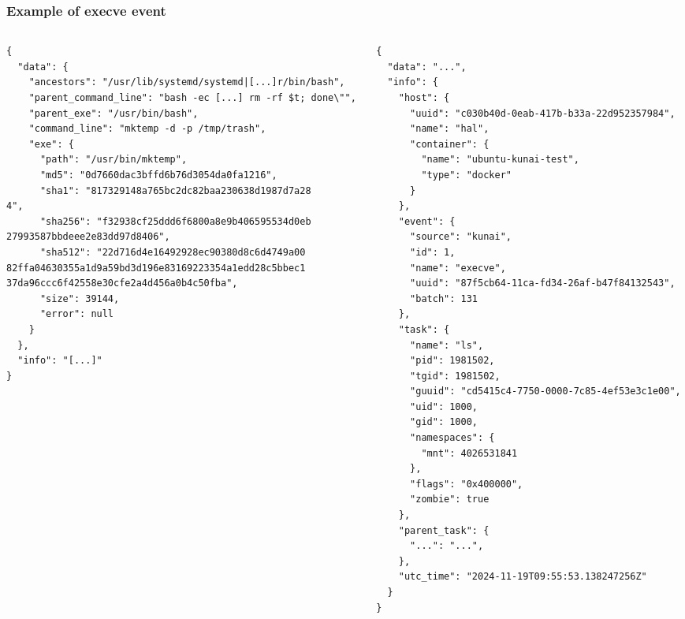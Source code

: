 \documentclass[10pt,aspectratio=169, colorlinks=true, linkcolor=circlBlue]{beamer}
\begin{document}
\begin{frame}[fragile]
	\frametitle{Example of execve event}

	\begin{columns}
		\begin{column}{0.5\textwidth}
			\begin{verbatim}
{
  "data": {
    "ancestors": "/usr/lib/systemd/systemd|[...]r/bin/bash",
    "parent_command_line": "bash -ec [...] rm -rf $t; done\"",
    "parent_exe": "/usr/bin/bash",
    "command_line": "mktemp -d -p /tmp/trash",
    "exe": {
      "path": "/usr/bin/mktemp",
      "md5": "0d7660dac3bffd6b76d3054da0fa1216",
      "sha1": "817329148a765bc2dc82baa230638d1987d7a28
4",
      "sha256": "f32938cf25ddd6f6800a8e9b406595534d0eb
27993587bbdeee2e83dd97d8406",
      "sha512": "22d716d4e16492928ec90380d8c6d4749a00
82ffa04630355a1d9a59bd3d196e83169223354a1edd28c5bbec1
37da96ccc6f42558e30cfe2a4d456a0b4c50fba",
      "size": 39144,
      "error": null
    }
  },
  "info": "[...]"
}
			\end{verbatim}
		\end{column}

		\begin{column}{0.45\textwidth}
			\begin{verbatim}
{
  "data": "...",
  "info": {
    "host": {
      "uuid": "c030b40d-0eab-417b-b33a-22d952357984",
      "name": "hal",
      "container": {
        "name": "ubuntu-kunai-test",
        "type": "docker"
      }
    },
    "event": {
      "source": "kunai",
      "id": 1,
      "name": "execve",
      "uuid": "87f5cb64-11ca-fd34-26af-b47f84132543",
      "batch": 131
    },
    "task": {
      "name": "ls",
      "pid": 1981502,
      "tgid": 1981502,
      "guuid": "cd5415c4-7750-0000-7c85-4ef53e3c1e00",
      "uid": 1000,
      "gid": 1000,
      "namespaces": {
        "mnt": 4026531841
      },
      "flags": "0x400000",
      "zombie": true
    },
    "parent_task": {
      "...": "...",
    },
    "utc_time": "2024-11-19T09:55:53.138247256Z"
  }
}
			\end{verbatim}
		\end{column}
	\end{columns}
\end{frame}
\end{document}
